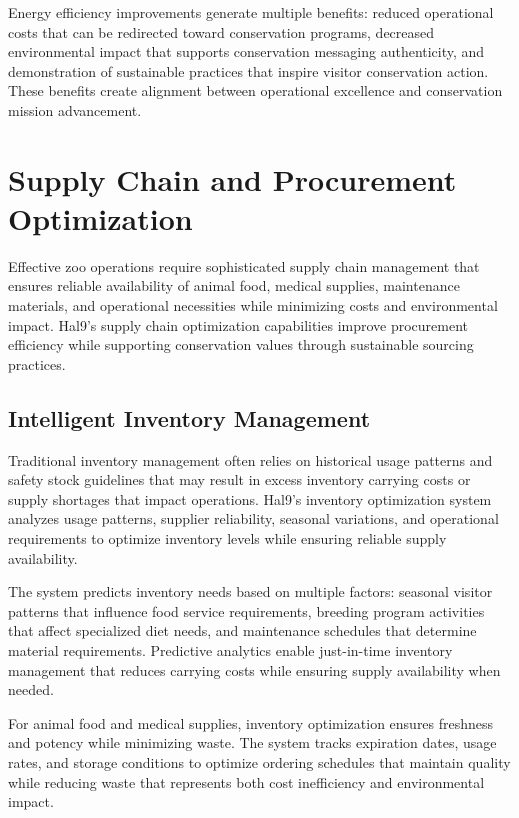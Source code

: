 \documentclass[
  Letterpaper,
]{scrbook}
\begin{document}
Energy efficiency improvements generate multiple benefits: reduced
operational costs that can be redirected toward conservation programs,
decreased environmental impact that supports conservation messaging
authenticity, and demonstration of sustainable practices that inspire
visitor conservation action. These benefits create alignment between
operational excellence and conservation mission advancement.

\section{Supply Chain and Procurement
Optimization}\label{supply-chain-and-procurement-optimization}

Effective zoo operations require sophisticated supply chain management
that ensures reliable availability of animal food, medical supplies,
maintenance materials, and operational necessities while minimizing
costs and environmental impact. Hal9's supply chain optimization
capabilities improve procurement efficiency while supporting
conservation values through sustainable sourcing practices.

\subsection{Intelligent Inventory
Management}\label{intelligent-inventory-management}

Traditional inventory management often relies on historical usage
patterns and safety stock guidelines that may result in excess inventory
carrying costs or supply shortages that impact operations. Hal9's
inventory optimization system analyzes usage patterns, supplier
reliability, seasonal variations, and operational requirements to
optimize inventory levels while ensuring reliable supply availability.

The system predicts inventory needs based on multiple factors: seasonal
visitor patterns that influence food service requirements, breeding
program activities that affect specialized diet needs, and maintenance
schedules that determine material requirements. Predictive analytics
enable just-in-time inventory management that reduces carrying costs
while ensuring supply availability when needed.

For animal food and medical supplies, inventory optimization ensures
freshness and potency while minimizing waste. The system tracks
expiration dates, usage rates, and storage conditions to optimize
ordering schedules that maintain quality while reducing waste that
represents both cost inefficiency and environmental impact.
\end{document}

